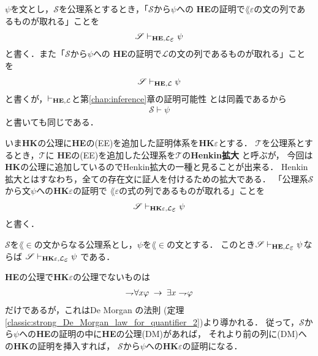 	$\psi$を文とし，$\mathscr{S}$を公理系とするとき，「$\mathscr{S}$から$\psi$への
	{\bf HE}の証明で$\lang{\varepsilon}$の文の列であるものが取れる」ことを
	\begin{align}
		\mathscr{S} \provable{\mbox{{\bf HE}},\lang{\varepsilon}} \psi
	\end{align}
	と書く．また「$\mathscr{S}$から$\psi$への
	{\bf HE}の証明で$\mathcal{L}$の文の列であるものが取れる」ことを
	\begin{align}
		\mathscr{S} \vdash_{{\scriptsize \mbox{{\bf HE}},\mathcal{L}}} \psi
	\end{align}
	と書くが，$\vdash_{{\scriptsize \mbox{{\bf HE}},\mathcal{L}}}$と第\ref{chap:inference}章の証明可能性
	とは同義であるから
	\begin{align}
		\mathscr{S} \vdash \psi
	\end{align}
	と書いても同じである．
	
	いま{\bf HK}の公理に{\bf HE}の(EE)を追加した証明体系を{\bf HK$\varepsilon$}とする．
	$\mathscr{T}$を公理系とするとき，$\mathscr{T}$に
	{\bf HE}の(EE)を追加した公理系を$\mathscr{T}$の{\bf Henkin拡大}
	と呼ぶが，
	今回は{\bf HK}の公理に追加しているのでHenkin拡大の一種と見ることが出来る．
	Henkin拡大とはすなわち，全ての存在文に証人を付けるための拡大である．
	「公理系$\mathscr{S}$から文$\psi$への{\bf HK$\varepsilon$}の証明で
	$\lang{\varepsilon}$の式の列であるものが取れる」ことを
	\begin{align}
		\mathscr{S} \provable{\mbox{{\bf HK}$\varepsilon$},\lang{\varepsilon}} \psi
	\end{align}
	と書く．
	
	\begin{screen}
		\begin{metathm}
		\label{metathm:Henkin_expansion_1}
			$\mathscr{S}$を$\lang{\in}$の文からなる公理系とし，$\psi$を$\lang{\in}$の文とする．
			このとき$\mathscr{S} \provable{\mbox{{\bf HE}},\lang{\varepsilon}} \psi$ならば
			$\mathscr{S} \provable{\mbox{{\bf HK}$\varepsilon$},\lang{\varepsilon}} \psi$
			である．
		\end{metathm}
	\end{screen}
	
	\begin{metaprf}
		{\bf HE}の公理で{\bf HK$\varepsilon$}の公理でないものは
		\begin{align}
			\rightharpoondown\hspace{-0.25em} \forall x \varphi \hspace{0.25em}\rightarrow\hspace{0.25em} \exists x \rightharpoondown\hspace{-0.25em} \varphi
		\end{align}
		だけであるが，これはDe Morgan の法則
		(定理\ref{classic:strong_De_Morgan_law_for_quantifier_2})より導かれる．
		従って，$\mathscr{S}$から$\psi$への{\bf HE}の証明の中に{\bf HE}の公理(DM)があれば，
		それより前の列に(DM)への{\bf HK}の証明を挿入すれば，
		$\mathscr{S}$から$\psi$への{\bf HK$\varepsilon$}の証明になる．
		\QED
	\end{metaprf}
	
